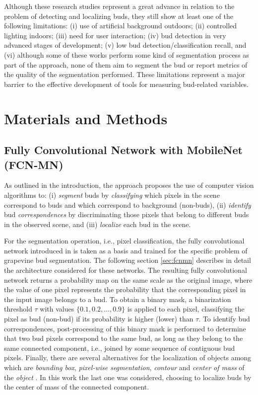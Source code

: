 \documentclass[a4paper,authoryear,review]{elsarticle}
\begin{document}
Although these research studies represent a great advance in relation to the problem of detecting and localizing buds, they still show at least one of the following limitations: (i) use of artificial background outdoors; (ii) controlled lighting indoors; (iii) need for user interaction; (iv) bud detection in very advanced stages of development; (v) low bud detection/classification recall, and (vi) although some of these works perform some kind of segmentation process as part of the approach, none of them aim to segment the bud or report metrics of the quality of the segmentation performed. These limitations represent a major barrier to the effective development of tools for measuring bud-related variables. 

\section{Materials and Methods}
\label{sec:matmet}


\subsection{Fully Convolutional Network with MobileNet (FCN-MN)}
\label{sec:fcn}

As outlined in the introduction, the approach proposes the use of computer vision algorithms to: (i) \emph{segment} buds by \emph{classifying} which pixels in the scene correspond to buds and which correspond to background (non-buds), (ii) \emph{identify} bud \emph{correspondences} by discriminating those pixels that belong to different buds in the observed scene, and (iii) \emph{localize} each bud in the scene. 

For the segmentation operation, i.e., pixel classification, the fully convolutional network introduced in \citep{long2015fully} is taken as a basis and trained for the specific problem of grapevine bud segmentation. The following section \ref{sec:fcnmn} describes in detail the architecture considered for these networks. The resulting fully convolutional network returns a probability map on the same scale as the original image, where the value of one pixel represents the probability that the corresponding pixel in the input image belongs to a bud. 
To obtain a binary mask, a binarization threshold $\tau$ with values $\{0.1, 0.2, \ldots, 0.9\}$ is applied to each pixel, classifying the pixel as bud (non-bud) if its probability is higher (lower) than $\tau$. To identify bud correspondences, post-processing of this binary mask is performed to determine that two bud pixels correspond to the same bud, as long as they belong to the same connected component, i.e., joined by some sequence of contiguous bud pixels. 
%
Finally, there are several alternatives for the localization of objects among which are \emph{bounding box}, \emph{pixel-wise segmentation}, \emph{contour} and \emph{center of mass} of the \emph{object} \citep{lampert2008beyond}. In this work the last one was considered, choosing to localize buds by the center of mass of the connected component. 
\end{document}
